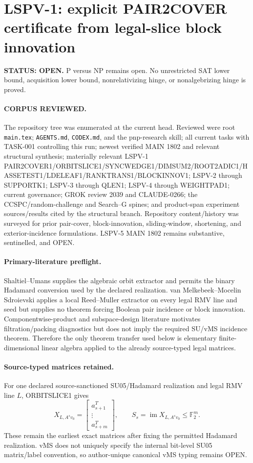 \documentclass[11pt]{article}
\begin{document}
\section*{LSPV-1: explicit PAIR2COVER certificate from legal-slice block innovation}
\textbf{STATUS: OPEN.} P versus NP remains open. No unrestricted SAT lower bound, acquisition lower bound, nonrelativizing hinge, or nonalgebrizing hinge is proved.

\paragraph{CORPUS REVIEWED.}
The repository tree was enumerated at the current head. Reviewed were root \texttt{main.tex}; \texttt{AGENTS.md}, \texttt{CODEX.md}, and the pnp-research skill; all current tasks with TASK-001 controlling this run; newest verified MAIN 1802 and relevant structural synthesis; materially relevant LSPV-1 PAIR2COVER1/ORBITSLICE1/SYNCWEDGE1/DIMSUM2/ROOT2ADIC1/HASSETEST1/LDELEAF1/RANKTRANS1/BLOCKINNOV1; LSPV-2 through SUPPORTK1; LSPV-3 through QLEN1; LSPV-4 through WEIGHTPAD1; current governance; GROK review 2039 and CLAUDE-0266; the CCSPC/random-challenge and Search--G spines; and product-span experiment sources/results cited by the structural branch. Repository content/history was surveyed for prior pair-cover, block-innovation, sliding-window, shortening, and exterior-incidence formulations. LSPV-5 MAIN 1802 remains substantive, sentinelled, and OPEN.

\paragraph{Primary-literature preflight.}
Shaltiel--Umans supplies the algebraic orbit extractor and permits the binary Hadamard conversion used by the declared realization. van Melkebeek--Mocelin Sdroievski applies a local Reed--Muller extractor on every legal RMV line and seed but supplies no theorem forcing Boolean pair incidence or block innovation. Componentwise-product and subspace-design literature motivates filtration/packing diagnostics but does not imply the required SU/vMS incidence theorem. Therefore the only theorem transfer used below is elementary finite-dimensional linear algebra applied to the already source-typed legal matrices.

\paragraph{Source-typed matrices retained.}
For one declared source-sanctioned SU05/Hadamard realization and legal RMV line $L$, ORBITSLICE1 gives
\[
X_{L,A^sv_0}=
\begin{bmatrix}
a_{s+1}^T\\
\vdots\\
a_{s+m}^T
\end{bmatrix},
\qquad
S_s=\operatorname{im}X_{L,A^sv_0}\le\mathbb F_2^m.
\]
These remain the earliest exact matrices after fixing the permitted Hadamard realization. vMS does not uniquely specify the internal bit-level SU05 matrix/label convention, so author-unique canonical vMS typing remains OPEN.
\end{document}
